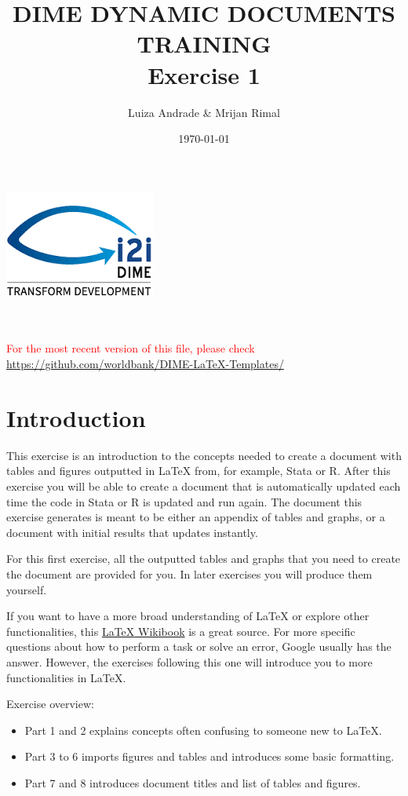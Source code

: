 \documentclass[12pts]{article}
\title{DIME DYNAMIC DOCUMENTS TRAINING \\ Exercise 1}
\author{Luiza Andrade \& Mrijan Rimal}
\date{\today}
\begin{document}
	
	
	\makeatletter
	\begin{titlepage}
		\begin{center}
			\includegraphics[width=0.3\linewidth]{../img/i2i.png}\\[10ex]
			{\LARGE \bfseries  \@title }\\[2ex] 
			{\Large  \@author}\\[20ex] 
			{\large \@date}
		\end{center}
		\vspace{5cm}
		\textcolor{red}{For the most recent version of this file, please check \url{https://github.com/worldbank/DIME-LaTeX-Templates/}}
	\end{titlepage}
	\makeatother
	
	\tableofcontents
	
	\newpage
	\section*{Introduction}
	
	This exercise is an introduction to the concepts needed to create a document with tables and figures outputted in {\LaTeX} from, for example, Stata or R. After this exercise you will be able to create a document that is automatically updated each time the code in Stata or R is updated and run again. The document this exercise generates is meant to be either an appendix of tables and graphs, or a document with initial results that updates instantly.
	
	For this first exercise, all the outputted tables and graphs that you need to create the document are provided for you. In later exercises you will produce them yourself.
	
	If you want to have a more broad understanding of {\LaTeX} or explore other functionalities, this \href{https://en.wikibooks.org/wiki/LaTeX
	}{{\LaTeX} Wikibook} is a great source. For more specific questions about how to perform a task or solve an error, Google usually has the answer. However, the exercises following this one will introduce you to more functionalities in {\LaTeX}.
	
	Exercise overview:
	\begin{itemize}
		\item Part 1 and 2 explains concepts often confusing to someone new to {\LaTeX}.
		\item Part 3 to 6 imports figures and tables and introduces some basic formatting.
		\item Part 7 and 8 introduces document titles and list of tables and figures.
	\end{itemize}
	
\end{document}
